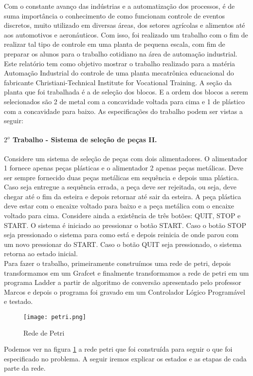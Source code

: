 \documentclass[a4paper,twoside]{articlewithlogo}
\begin{document}
\large
{}

\conteudo
\newpage
{}
Com o constante avanço das indústrias e a automatização dos processos, é de suma importância o conhecimento de como funcionam controle de eventos discretos, muito utilizado em diversas áreas, dos setores agrícolas e alimentos até aos automotivos e aeronáuticos. Com isso, foi realizado um trabalho com o fim de realizar tal tipo de controle em uma planta de pequena escala, com fim de preparar os alunos para o trabalho cotidiano na área de automação industrial.
Este relatório tem como objetivo mostrar o trabalho realizado para a matéria Automação Industrial do controle de uma planta mecatrônica educacional do fabricante Christiani-Technical Institute for Vocational Training. 
A seção da planta que foi trabalhada é a de seleção dos blocos. E a ordem dos blocos a serem selecionados são 2 de metal com a concavidade voltada para cima e 1 de plástico com a concavidade para baixo.
As especificações do trabalho podem ser vistas a seguir:
\paragraph{$2^o$ Trabalho - Sistema de seleção de peças II.\\}
Considere um sistema de seleção de peças com dois alimentadores. O alimentador 1
fornece apenas peças plásticas e o alimentador 2 apenas peças metálicas. Deve ser sempre
fornecido duas peças metálicas em sequência e depois uma plástica. Caso seja entregue
a sequência errada, a peça deve ser rejeitada, ou seja, deve chegar até o fim da esteira e
depois retornar até sair da esteira. A peça plástica deve estar com o encaixe voltado para
baixo e a peça metálica com o encaixe voltado para cima. Considere ainda a existência de
três botões: QUIT, STOP e START. O sistema é iniciado ao pressionar o botão START.
Caso o botão STOP seja pressionado o sistema para como está e depois reinicia de onde
parou com um novo pressionar do START. Caso o botão QUIT seja pressionado, o sistema
retorna ao estado inicial.
\\
Para fazer o trabalho, primeiramente construímos uma rede de petri, depois transformamos em um Grafcet e finalmente transformamos a rede de petri em um programa Ladder a partir de algoritmo de conversão apresentado pelo professor Marcos e depois o programa foi gravado em um Controlador Lógico Programável e testado.
\newpage
\eject \pdfpagewidth=28in \pdfpageheight=12in
\begin{figure}[H]
\texttt{[image: petri.png]}
\caption{Rede de Petri}
\label{rededepetri}
\end{figure}
\eject \pdfpagewidth=210mm \pdfpageheight=297mm
\newpage
Podemos ver na figura \ref{rededepetri} a rede petri que foi construída para seguir o que foi especificado no problema. A seguir iremos explicar os estados e as etapas de cada parte da rede.
\end{document}
